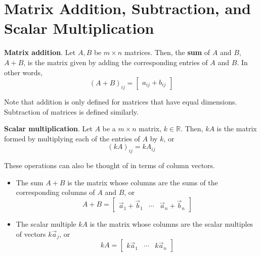\documentclass[letterpaper,12pt]{article}
\begin{document}
\section*{Matrix Addition, Subtraction, and Scalar Multiplication}
\begin{definition}
\textbf{Matrix addition}. Let $A, B$ be $m \times n$ matrices. Then, the \textbf{sum} of $A$ and $B$, $A + B$, is the matrix given by adding the corresponding entries of $A$ and $B$. In other words,
\begin{equation*}
    \boxed{(A + B)_{ij} = \begin{bmatrix} a_{ij} + b_{ij} \end{bmatrix}}
\end{equation*}
\end{definition}

Note that addition is only defined for matrices that have equal dimensions. Subtraction of matrices is defined similarly.

\begin{definition}
\textbf{Scalar multiplication}. Let $A$ be a $m \times n$ matrix, $k \in \mathbb{R}$. Then, $kA$ is the matrix formed by multiplying each of the entries of $A$ by $k$, or
\begin{equation*}
    \boxed{(kA)_{ij} = kA_{ij}}
\end{equation*}
\end{definition}

These operations can also be thought of in terms of column vectors.
\begin{itemize}
    \item The sum $A + B$ is the matrix whose columns are the sums of the corresponding columns of $A$ and $B$, or
    \begin{equation*}
        A + B = \begin{bmatrix} \vec{a}_1 + \vec{b}_1 & \cdots & \vec{a}_n + \vec{b}_n \end{bmatrix}
    \end{equation*}
    \item The scalar multiple $kA$ is the matrix whose columns are the scalar multiples of vectors $k \vec{a}_j$, or
    \begin{equation*}
        kA = \begin{bmatrix} k \vec{a}_1 & \cdots & k \vec{a}_n \end{bmatrix}
    \end{equation*}
\end{itemize}
\end{document}
